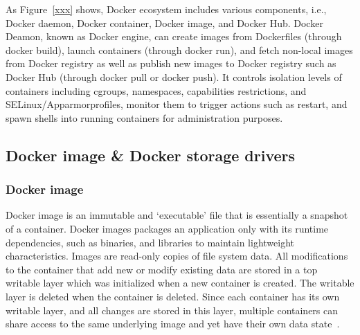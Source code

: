 
As Figure~\ref{xxx} shows, Docker ecosystem includes various components, i.e., Docker daemon, Docker container, Docker image, and Docker Hub. Docker Deamon, known as Docker engine, can create images from Dockerfiles (through docker build), launch containers (through docker run), and fetch non-local images from Docker registry as well as publish new images to Docker registry such as Docker Hub (through docker pull or docker push). It controls isolation levels of containers including cgroups, namespaces, capabilities restrictions, and SELinux/Apparmorprofiles, monitor them to trigger actions such as restart, and spawn shells into running containers for administration purposes. 
 
\subsection{Docker image \& Docker storage drivers}

\subsubsection{Docker image}

Docker image is an immutable and `executable' file that is essentially a snapshot of a container. Docker images packages an application only with its runtime dependencies, such as binaries, and libraries to maintain lightweight characteristics. Images are read-only copies of file system data. All modifications to the container that add new or modify existing data are stored in a top writable layer which was initialized when a new container is created. The writable layer is deleted when the container is deleted. Since each container has its own writable layer, and all changes are stored in this layer, multiple containers can share access to the same underlying image and yet have their own data state~\cite{}. 


